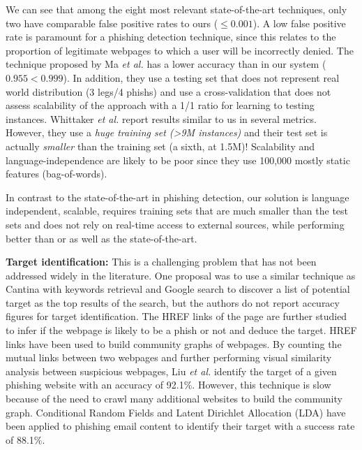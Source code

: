 \documentclass[10pt,conference,compsocconf,letterpaper]{IEEEtran}
\begin{document}
We can see that among the eight most relevant state-of-the-art techniques, only two \cite{Ma:2009:beyond,whittaker:2010:large} have comparable false positive rates to ours ($\leq 0.001$). A low false positive rate is paramount for a phishing detection technique, since this relates to the proportion of legitimate webpages to which a user will be incorrectly denied.
The technique proposed by Ma \textit{et al.} \cite{Ma:2009:beyond} has a lower accuracy than in our system ($0.955<0.999$). In addition, they use a testing set that does not represent real world distribution (3 legs/4 phishs) and use a cross-validation that does not assess scalability of the approach with a 1/1 ratio for learning to testing instances. 
Whittaker \textit{et al.} \cite{whittaker:2010:large} report results similar to us in several metrics. However, they use a \emph{huge training set (\textgreater 9M instances)} and their test set is actually \emph{smaller} than the training set (a sixth, at 1.5M)! Scalability and language-independence are likely to be poor since they use 100,000 mostly static features (bag-of-words).


In contrast to the state-of-the-art in phishing detection, our solution is language independent, scalable, requires training sets that are much smaller than the test sets and does not rely on real-time access to external sources, while performing better than or as well as the state-of-the-art.



\iftargetid
\textbf{Target identification:}
This is a challenging problem that has not been addressed widely in the literature. One proposal \cite{ramesh:2014:efficious} was to use a similar technique as Cantina with keywords retrieval and Google search to discover a list of potential target as the top results of the search, but the authors do not report accuracy figures for target identification.
\iffullversion
The HREF links of the page are further studied to infer if the webpage is likely to be a phish or not and deduce the target. 
\fi
HREF links have been used to build community graphs of webpages. By counting the mutual links between two webpages and further performing visual similarity analysis between suspicious webpages, Liu \textit{et al.} \cite{liu:2012:anti} identify the target of a given phishing website with an accuracy of 92.1\%. However, this technique is slow because of the need to crawl many additional websites to build the community graph.
Conditional Random Fields and Latent Dirichlet Allocation (LDA) \cite{blei:2003:latent} have been applied to phishing email content to identify their target \cite{ramanathan:2013:phishing} with a success rate of 88.1\%.
\end{document}
